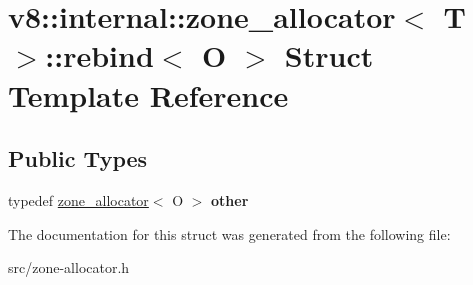 \hypertarget{structv8_1_1internal_1_1zone__allocator_1_1rebind}{}\section{v8\+:\+:internal\+:\+:zone\+\_\+allocator$<$ T $>$\+:\+:rebind$<$ O $>$ Struct Template Reference}
\label{structv8_1_1internal_1_1zone__allocator_1_1rebind}
\subsection*{Public Types}
\begin{DoxyCompactItemize}
\item 
\hypertarget{structv8_1_1internal_1_1zone__allocator_1_1rebind_af5838e2755c3d110555b592c5557a08d}{}typedef \hyperlink{classv8_1_1internal_1_1zone__allocator}{zone\+\_\+allocator}$<$ O $>$ {\bfseries other}\label{structv8_1_1internal_1_1zone__allocator_1_1rebind_af5838e2755c3d110555b592c5557a08d}

\end{DoxyCompactItemize}


The documentation for this struct was generated from the following file\+:\begin{DoxyCompactItemize}
\item 
src/zone-\/allocator.\+h\end{DoxyCompactItemize}
